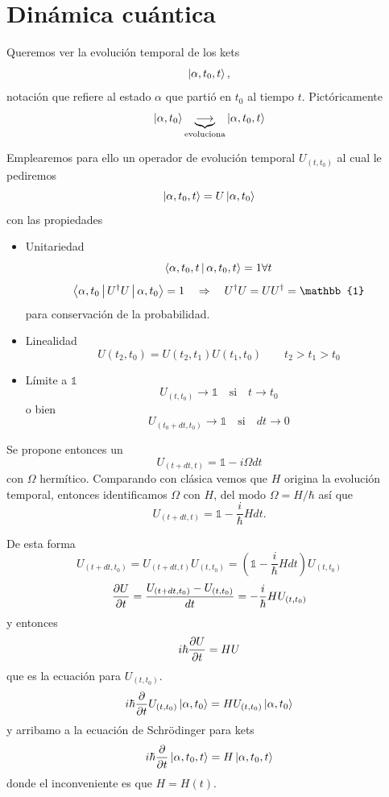 \documentclass[10pt,oneside]{CBFT_book}
\begin{document}
\chapter{Dinámica cuántica}

Queremos ver la evolución temporal de los kets 
\[
	\Ket{\alpha,t_0,t},
\]
notación que refiere al estado $\alpha$ que partió en $t_0$ al tiempo $t$. Pictóricamente
\[
	\Ket{\alpha,t_0} \underbrace{\longrightarrow}_{\text{evoluciona}} \Ket{\alpha,t_0,t}
\]

Emplearemos para ello un operador de evolución temporal $U_{(t,t_0)}$ al cual le pediremos
\[
	\Ket{\alpha,t_0,t} = U \Ket{\alpha,t_0}
\]
con las propiedades

\begin{itemize}
 \item Unitariedad
 \[
	\Braket{ \alpha,t_0,t| \alpha,t_0,t} = 1 \forall t
 \]
 \[
	\Braket{ \alpha,t_0| U^\dagger U| \alpha,t_0} = 1 \quad \Rightarrow \quad 
	U^\dagger U = U U^\dagger = \mathbb{1}
 \]
 para conservación de la probabilidad.
 \item Linealidad
 \[
	U(t_2,t_0) = U(t_2,t_1) U(t_1,t_0) \qquad t_2>t_1>t_0
 \]
 \item Límite a $\mathbb{1}$
 \[
	U_{(t,t_0)} \to \mathbb{1} \quad \text{si} \quad t\to t_0
 \]
 o bien 
 \[
	U_{(t_0+dt,t_0)} \to \mathbb{1} \quad \text{si} \quad dt\to 0
 \]
\end{itemize}

Se propone entonces un 
\[
	U_{(t+dt,t)} = \mathbb{1} - i\Omega dt 
\]
con $\Omega$ hermítico. Comparando con clásica vemos que $H$ origina la evolución temporal, entonces
identificamos $\Omega$ con $H$, del modo $\Omega = H/\hbar$ así que 
\[
	U_{(t+dt,t)} = \mathbb{1} - \frac{i}{\hbar} H dt .
\]

De esta forma 
\[
	U_{(t+dt,t_0)} =  U_{(t+dt,t)} U_{(t,t_0)}  = \left( \mathbb{1} - \frac{i}{\hbar} H dt \right) U_{(t,t_0)}
\]
\[
	\frac{\partial^{\hspace{-0.05em}} {U}}{\partial {t}^{\hspace{-0.05em}}} = \frac{ U_{(t+dt,t_0)} - U_{(t,t_0)} }{dt} = - \frac{i}{\hbar}H U_{(t,t_0)}
\]
y entonces 
\[
	i\hbar\frac{\partial^{\hspace{-0.05em}} {U}}{\partial {t}^{\hspace{-0.05em}}} = HU
\]
que es la ecuación para $U_{(t,t_0)}$.
\[
	i\hbar\frac{\partial^{\hspace{-0.05em}} {}}{\partial {t}^{\hspace{-0.05em}}} U_{(t,t_0)} \Ket{\alpha,t_0} = H U_{(t,t_0)} \Ket{\alpha,t_0}
\]
y arribamo a la ecuación de Schrödinger para kets
\[
	i\hbar\frac{\partial^{\hspace{-0.05em}} {}}{\partial {t}^{\hspace{-0.05em}}} \Ket{\alpha,t_0,t} = H \Ket{\alpha,t_0,t}
\]
donde el inconveniente es que $H=H(t)$.
\end{document}
